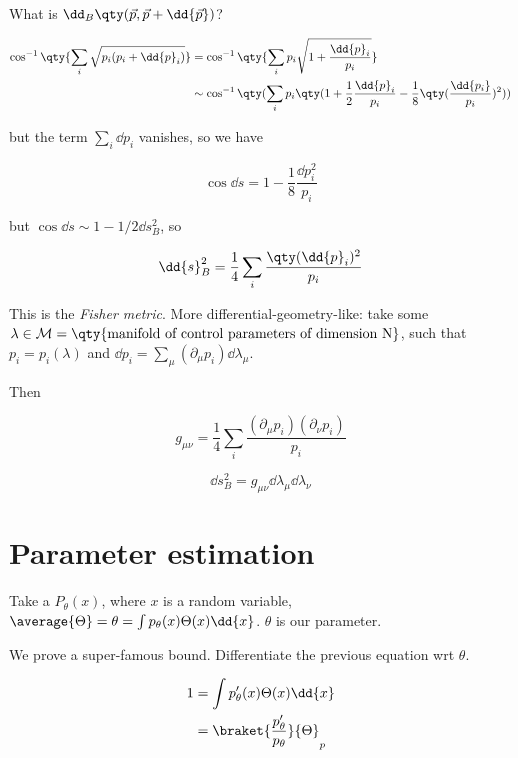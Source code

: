 What is \( \dd _{B} \qty(\vec{p} , \vec{p} + \dd{\vec{p}}) \)?

\begin{align}
  \cos ^{-1} \qty{\sum_i \sqrt{p_i(p_i + \dd{p}_i)}}
  &= \cos ^{-1} \qty{\sum_i p_i \sqrt{1 + \frac{\dd{p}_i }{p_i}}}  \\
  &\sim \cos ^{-1} \qty(\sum_i p_i \qty(1 + \frac{1}{2} \frac{\dd{p}_i}{p_i} - \frac{1}{8} \qty(\frac{\dd{p_i}}{p_i})^{2} ))
\end{align}

but the term \( \sum_i \dd{p}_i \) vanishes, so we have

\begin{equation}
  \cos \dd{s} = 1 - \frac{1}{8}\frac{\dd{p}_i ^{2} }{p_i}
\end{equation}

but \( \cos \dd{s} \sim 1 - 1/2 \dd{s}^{2} _{B}  \), so

\begin{equation} \label{eq:fisher-metric}
  \dd{s}^{2}_{B}  = \frac{1}{4} \sum_i  \frac{\qty(\dd{p}_i)^{2} }{p_i}
\end{equation}

This is the \emph{Fisher metric}. More differential-geometry-like: take some \( \lambda \in \mathcal{M} = \qty{\text{manifold of control parameters of dimension N}} \), such that \( p_i = p_i(\lambda) \) and  \( \dd{p}_i = \sum_\mu (\partial_\mu p_i) \dd{\lambda_\mu} \).

Then

\begin{equation}
  g _{\mu \nu} = \frac{1}{4} \sum_i \frac{(\partial_\mu p_i)(\partial_\nu p_i)}{p_i}
\end{equation}

\begin{equation}
  \dd{s}_B ^2 = g _{\mu \nu} \dd{\lambda}_\mu \dd{\lambda}_\nu
\end{equation}

\section{Parameter estimation}

Take a \(P_\theta (x)\), where \( x \) is a random variable, \( \average{\Theta} = \theta = \int  p_\theta(x) \Theta(x) \dd{x}  \). \(\theta\) is our parameter.

We prove a super-famous bound. Differentiate the previous equation wrt \( \theta \).

\begin{align}
  1 &= \int  p' _\theta (x) \Theta (x) \dd{x}  \\
  &= \braket{\frac{p'_\theta}{p_\theta}}{\Theta}_p
\end{align}

